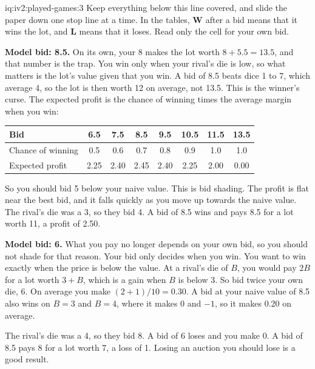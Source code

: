 \begin{solution}{iq:iv2:played-games:3}
Keep everything below this line covered, and slide the paper down one stop line at a time. In the tables, \textbf{W} after a bid means that it wins the lot, and \textbf{L} means that it loses. Read only the cell for your own bid.

\ivstop

\textbf{Model bid: 8.5.} On its own, your 8 makes the lot worth $8 + 5.5 = 13.5$, and that number is the trap. You win only when your rival's die is low, so what matters is the lot's value given that you win. A bid of 8.5 beats dice 1 to 7, which average 4, so the lot is then worth 12 on average, not 13.5. This is the winner's curse. The expected profit is the chance of winning times the average margin when you win:
\begin{center}\small
\begin{tabular}{@{}l*{7}{c}@{}}
Bid & 6.5 & 7.5 & 8.5 & 9.5 & 10.5 & 11.5 & 13.5 \\ \hline
Chance of winning & 0.5 & 0.6 & 0.7 & 0.8 & 0.9 & 1.0 & 1.0 \\
Expected profit & 2.25 & 2.40 & 2.45 & 2.40 & 2.25 & 2.00 & 0.00
\end{tabular}
\end{center}
So you should bid 5 below your naive value. This is bid shading. The profit is flat near the best bid, and it falls quickly as you move up towards the naive value. The rival's die was a 3, so they bid 4. A bid of 8.5 wins and pays 8.5 for a lot worth 11, a profit of 2.50.

\ivstop

\textbf{Model bid: 6.} What you pay no longer depends on your own bid, so you should not shade for that reason. Your bid only decides when you win. You want to win exactly when the price is below the value. At a rival's die of $B$, you would pay $2B$ for a lot worth $3 + B$, which is a gain when $B$ is below 3. So bid twice your own die, 6. On average you make $(2 + 1)/10 = 0.30$. A bid at your naive value of 8.5 also wins on $B = 3$ and $B = 4$, where it makes 0 and $-1$, so it makes 0.20 on average.

The rival's die was a 4, so they bid 8. A bid of 6 loses and you make 0. A bid of 8.5 pays 8 for a lot worth 7, a loss of 1. Losing an auction you should lose is a good result.


\end{solution}
